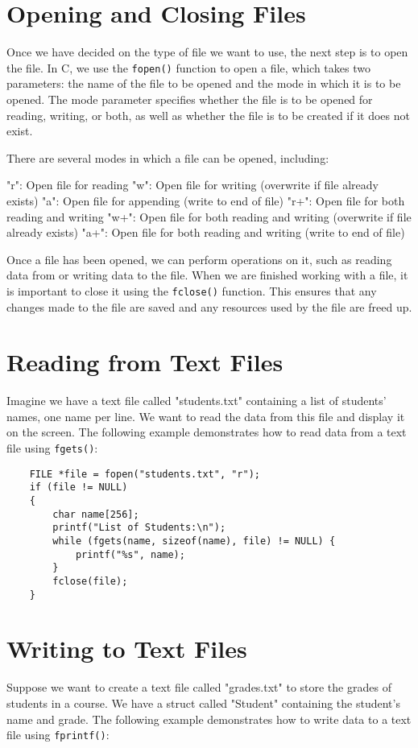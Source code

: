\section{Opening and Closing Files}
Once we have decided on the type of file we want to use, the next step is to open the
file. In C, we use the {\tt fopen()} function to open a file, which takes two parameters:
the name of the file to be opened and the mode in which it is to be opened. The mode
parameter specifies whether the file is to be opened for reading, writing, or both, as
well as whether the file is to be created if it does not exist.

There are several modes in which a file can be opened, including:

"r": Open file for reading
"w": Open file for writing (overwrite if file already exists)
"a": Open file for appending (write to end of file)
"r+": Open file for both reading and writing
"w+": Open file for both reading and writing (overwrite if file already exists)
"a+": Open file for both reading and writing (write to end of file)

Once a file has been opened, we can perform operations on it, such as reading data from
or writing data to the file. When we are finished working with a file, it is important to
close it using the {\tt fclose()} function. This ensures that any changes made to the
file are saved and any resources used by the file are freed up.


\section{Reading from Text Files}
Imagine we have a text file called "students.txt" containing a list of students' names, one name per line. We want to read the data from this file and display it on the screen. The following example demonstrates how to read data from a text file using {\tt fgets()}:

\begin{verbatim}
	FILE *file = fopen("students.txt", "r");
	if (file != NULL) 
	{
		char name[256];
		printf("List of Students:\n");
		while (fgets(name, sizeof(name), file) != NULL) {
			printf("%s", name);
		}
		fclose(file);
	}
\end{verbatim}

\section{Writing to Text Files}
Suppose we want to create a text file called "grades.txt" to store the grades of students in a course. We have a struct called "Student" containing the student's name and grade. The following example demonstrates how to write data to a text file using {\tt fprintf()}:

